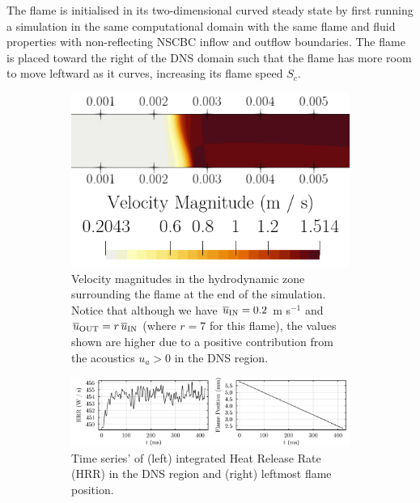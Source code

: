 The flame is initialised in its two-dimensional curved steady state by first running a simulation in the same computational domain with the same flame and fluid properties with non-reflecting NSCBC inflow and outflow boundaries. The flame is placed toward the right of the DNS domain such that the flame has more room to move leftward as it curves, increasing its flame speed $S_c$.

\begin{figure}[t]
\centering
\begin{subfigure}{0.99\textwidth}
\centering
\includegraphics[scale=0.36]{assets/graphs/THERMOAC_mag-v.png}
\caption{Velocity magnitudes in the hydrodynamic zone surrounding the flame at the end of the simulation. Notice that although we have $\overline{u}_{\rm{IN}} = 0.2$ m s$^{-1}$ and $\overline{u}_{\rm{OUT}} = r \, \overline{u}_{\rm{IN}}$ (where $r = 7$ for this flame), the values shown are higher due to a positive contribution from the acoustics $u_a > 0$ in the DNS region.}
\label{fig:mag-v}
\end{subfigure}

\vspace*{0.5em}

\begin{subfigure}{0.99\textwidth}
\centering
\includegraphics[scale=0.35]{assets/graphs/2mmx1m_still_hrr-flame.pdf}
\caption{Time series' of (left) integrated Heat Release Rate (HRR) in the DNS region and (right) leftmost flame position.}
\label{fig:hrr-flame}
\end{subfigure}
\caption{}
\label{fig:flame}
\end{figure}

